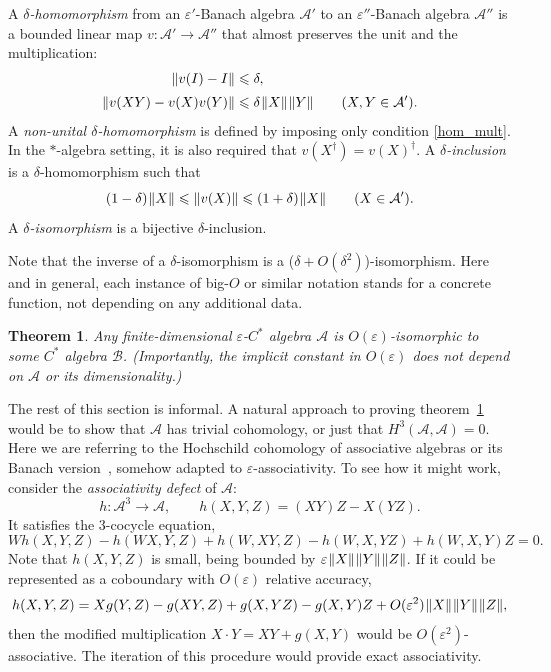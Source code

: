 \documentclass[12pt]{article}
\newcommand{\calA}{\mathcal{A}}
\newcommand{\calB}{\mathcal{B}}
\newcommand{\ts}{\mkern1mu}
\newcommand{\eps}{\varepsilon}
\renewcommand{\le}{\leqslant}
\newtheorem{Theorem}{Theorem}[section]
\newtheorem[definition]{Definition}[Theorem]{Definition}
\newtheorem[remark]{Example}[Theorem]{Example}
\newtheorem[remark]{Remark}[Theorem]{Remark}
\newtheorem[remark]{Question}[Theorem]{Open question}
\newtheorem*[definition]{definition}{Definition}
\newtheorem*[remark]{example}{Example}
\newtheorem*[remark]{remark}{Remark}
\newtheorem*[remark]{question}{Open question}
\numberwithin{equation}{section}
\begin{document}
\begin{Definition}
A \emph{$\delta$-homomorphism} from an $\eps'$-Banach algebra $\calA'$ to an $\eps''$-Banach algebra $\calA''$ is a bounded linear map $v\colon \calA'\to\calA''$ that almost preserves the unit and the multiplication:
\begin{align}
\label{hom_unit}
\|v(I)-I\|&\le \delta,\\[2pt]
\label{hom_mult}
\|v(XY)-v(X)v(Y)\|&\le \delta\ts\|X\|\ts\|Y\|\qquad (X,Y\in \calA').
\end{align}
A \emph{non-unital $\delta$-homomorphism} is defined by imposing only condition \eqref{hom_mult}. In the $*$-algebra setting, it is also required that $v(X^\dag)=v(X)^\dag$. A \emph{$\delta$-inclusion} is a $\delta$-homomorphism such that
\begin{equation}
(1-\delta)\ts\|X\|\le \|v(X)\|\le (1+\delta)\ts\|X\|\qquad (X\in \calA').
\end{equation}
A \emph{$\delta$-isomorphism} is a bijective $\delta$-inclusion.
\end{Definition}

Note that the inverse of a $\delta$-isomorphism is a ($\delta+O(\delta^2)$)-isomorphism. Here and in general, each instance of big-$O$ or similar notation stands for a concrete function, not depending on any additional data.

\begin{Theorem}\label{th_main}
Any finite-dimensional $\eps$-$C^*$ algebra $\calA$ is $O(\eps)$-isomorphic to some $C^*$ algebra $\calB$. (Importantly, the implicit constant in $O(\eps)$ does not depend on $\calA$ or its dimensionality.)\medskip
\end{Theorem}

The rest of this section is informal. A natural approach to proving theorem~\ref{th_main} would be to show that $\calA$ has trivial cohomology, or just that $H^3(\calA,\calA)=0$. Here we are referring to the Hochschild cohomology of associative algebras or its Banach version~\cite{Joh-coh}, somehow adapted to $\eps$-associativity. To see how it might work, consider the \emph{associativity defect} of $\calA$:
\begin{equation}
h\colon \calA^3\to\calA,\qquad
h(X,Y,Z)=(XY)Z-X(YZ).
\end{equation}
It satisfies the 3-cocycle equation,
\begin{equation}
W h(X,Y,Z) - h(WX,Y,Z) + h(W,XY,Z) - h(W,X,YZ) + h(W,X,Y) Z =0.
\end{equation}
Note that $h(X,Y,Z)$ is small, being bounded by $\eps\ts\|X\|\ts\|Y\|\ts\|Z\|$. If it could be represented as a coboundary with $O(\eps)$ relative accuracy,
\begin{equation}
h(X,Y,Z) = X g(Y,Z) - g(XY,Z) + g(X,YZ) - g(X,Y) Z
+O(\eps^2)\ts\|X\|\ts\|Y\|\ts\|Z\|,
\end{equation}
then the modified multiplication $X\cdot Y=XY+g(X,Y)$ would be $O(\eps^2)$-associative. The iteration of this procedure would provide exact associativity.
\end{document}
